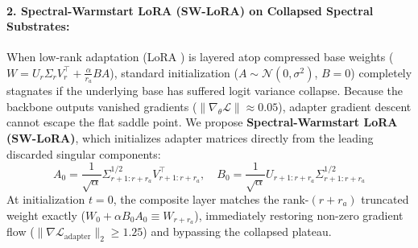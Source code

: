 \documentclass{article}
\begin{document}
\paragraph{2. Spectral-Warmstart LoRA (SW-LoRA) on Collapsed Spectral Substrates:}
When low-rank adaptation (LoRA \citep{hu2022lora}) is layered atop compressed base weights ($W = U_r \Sigma_r V_r^\top + \frac{\alpha}{r_a} B A$), standard initialization ($A \sim \mathcal{N}(0, \sigma^2)$, $B = 0$) completely stagnates if the underlying base has suffered logit variance collapse. Because the backbone outputs vanished gradients ($\|\nabla_\theta \mathcal{L}\| \approx 0.05$), adapter gradient descent cannot escape the flat saddle point.
We propose \textbf{Spectral-Warmstart LoRA (SW-LoRA)}, which initializes adapter matrices directly from the leading discarded singular components:
\begin{equation}
    A_0 = \frac{1}{\sqrt{\alpha}} \Sigma_{r+1:r+r_a}^{1/2} V_{r+1:r+r_a}^\top, \quad B_0 = \frac{1}{\sqrt{\alpha}} U_{r+1:r+r_a} \Sigma_{r+1:r+r_a}^{1/2}
\end{equation}
At initialization $t = 0$, the composite layer matches the rank-$(r+r_a)$ truncated weight exactly ($W_0 + \alpha B_0 A_0 \equiv W_{r+r_a}$), immediately restoring non-zero gradient flow ($\|\nabla \mathcal{L}_{\text{adapter}}\|_2 \ge 1.25$) and bypassing the collapsed plateau.
\end{document}
